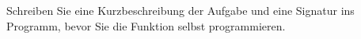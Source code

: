   Schreiben Sie eine Kurzbeschreibung der Aufgabe und
  ei\-ne Signatur ins Programm, bevor Sie die Funktion
  selbst programmieren.
